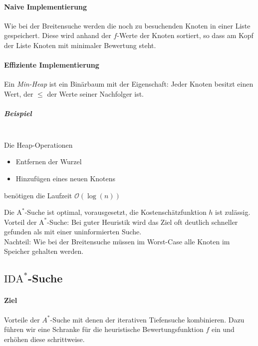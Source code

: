 \documentclass[a4paper]{scrartcl}
\begin{document}
\paragraph{Naive Implementierung} Wie bei der Breitensuche werden die noch zu besuchenden Knoten in einer Liste gespeichert. Diese wird anhand der $f$-Werte der Knoten sortiert, so dass am Kopf der Liste Knoten mit minimaler Bewertung steht.

\paragraph{Effiziente Implementierung} Ein \emph{Min-Heap} ist ein Binärbaum mit der Eigenschaft: Jeder Knoten besitzt einen Wert, der $\leq$ der Werte seiner Nachfolger ist.

\subparagraph{Beispiel}
\\
Die Heap-Operationen
\begin{itemize}
\item Entfernen der Wurzel
\item Hinzufügen eines neuen Knotens
\end{itemize} benötigen die Laufzeit $\mathcal{O} (\log{(n)})$

Die $\text{A}^*$-Suche ist optimal, vorausgesetzt, die Kostenschätzfunktion $h$ ist zulässig.\\
Vorteil der $\text{A}^*$-Suche: Bei guter Heuristik wird das Ziel oft deutlich schneller gefunden als mit einer uninformierten Suche.\\
Nachteil: Wie bei der Breitensuche müssen im Worst-Case alle Knoten im Speicher gehalten werden.

\subsection{$\text{IDA}^*$-Suche}
\paragraph{Ziel} Vorteile der $A^*$-Suche mit denen der iterativen Tiefensuche kombinieren. Dazu führen wir eine Schranke für die heuristische Bewertungsfunktion $f$ ein und erhöhen diese schrittweise.
\end{document}
